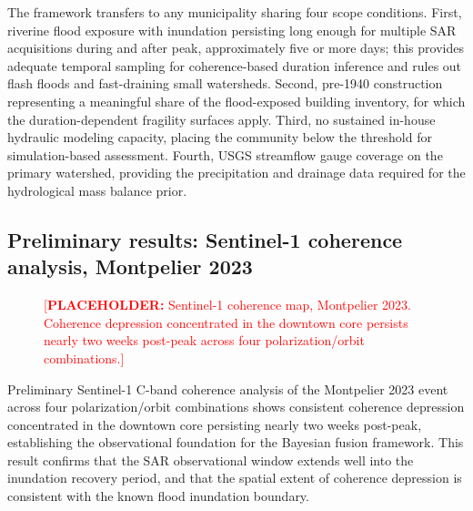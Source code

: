 \documentclass[11pt]{article}
\newcommand{\placeholder}[1]{\textcolor{red}{[\textbf{PLACEHOLDER:} #1]}}
\begin{document}
The framework transfers to any municipality sharing four scope conditions.
First, riverine flood exposure with inundation persisting long enough for multiple SAR acquisitions during and after peak, approximately five or more days; this provides adequate temporal sampling for coherence-based duration inference and rules out flash floods and fast-draining small watersheds.
Second, pre-1940 construction representing a meaningful share of the flood-exposed building inventory, for which the duration-dependent fragility surfaces apply.
Third, no sustained in-house hydraulic modeling capacity, placing the community below the threshold for simulation-based assessment.
Fourth, USGS streamflow gauge coverage on the primary watershed, providing the precipitation and drainage data required for the hydrological mass balance prior.

\vspace{-10pt}
\subsection{Preliminary results: Sentinel-1 coherence analysis, Montpelier 2023}

\begin{figure}
\vspace{-0.4cm}
\captionsetup{justification=centering,singlelinecheck=false,font=small}
\vspace{-0.9cm}
\caption{\placeholder{Sentinel-1 coherence map, Montpelier 2023.  Coherence depression concentrated in the downtown core persists nearly two weeks post-peak across four polarization/orbit combinations.}}
\label{fig:coherence}
\vspace{-0.3cm}
\end{figure}

Preliminary Sentinel-1 C-band coherence analysis of the Montpelier 2023 event across four polarization/orbit combinations shows consistent coherence depression
concentrated in the downtown core persisting nearly two weeks post-peak, establishing the observational foundation for the Bayesian fusion framework.
This result confirms that the SAR observational window extends well into the inundation recovery period, and that the spatial extent of coherence depression
is consistent with the known flood inundation boundary.
\end{document}
